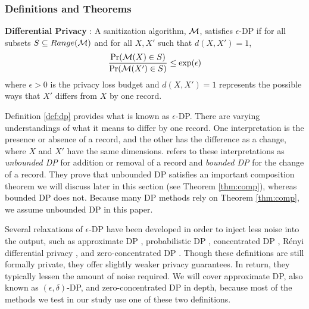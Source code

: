 \subsubsection{Definitions and Theorems}\label{subsec:def}
\begin{defn}\label{def:dp}
    \textbf{Differential Privacy} \citep{dwork2006calibrating}:
    A sanitization algorithm, $\mathcal{M}$, satisfies $\epsilon$-DP if for all subsets $S\subseteq Range(\mathcal{M})$ and for all $X,X'$ such that $d(X,X')=1$, 
        \begin{equation}\label{eqn:dp}
            \frac{\Pr(\mathcal{M}( X) \in S)}{ \Pr(\mathcal{M}( X')\in S)}\le \exp(\epsilon)
        \end{equation}
    \noindent where $\epsilon>0$ is the privacy loss budget and $d(X,X')=1$ represents the possible ways that $X'$ differs from $X$ by one record.
\end{defn}
\vspace{-8pt}
Definition \ref{def:dp} provides what is known as $\epsilon$-DP. There are varying understandings of what it means to differ by one record. One interpretation is the presence or absence of a record, and the other has the difference as a change, where $X$ and $X'$ have the same dimensions. \citet{li2016differential} refers to these interpretations as \textit{unbounded DP} for addition or removal of a record and \textit{bounded DP} for the change of a record. They prove that unbounded DP satisfies an important composition theorem we will discuss later in this section (see Theorem \ref{thm:comp}), whereas bounded DP does not. Because many DP methods rely on Theorem \ref{thm:comp}, we assume unbounded DP in this paper.

Several relaxations of $\epsilon$-DP have been developed in order to inject less noise into the output, such as approximate DP \citep{dwork2006our}, probabilistic DP \citep{machanavajjhala2008privacy}, concentrated DP \citep{dwork2016concentrated}, R\'enyi differential privacy \citep{mironov2017renyi}, and zero-concentrated DP \citep{bun2016concentrated}. Though these definitions are still formally private, they offer slightly weaker privacy guarantees. In return, they typically lessen the amount of noise required. We will cover approximate DP, also known as $(\epsilon, \delta)$-DP, and zero-concentrated DP in depth, because most of the methods we test in our study use one of these two definitions.

